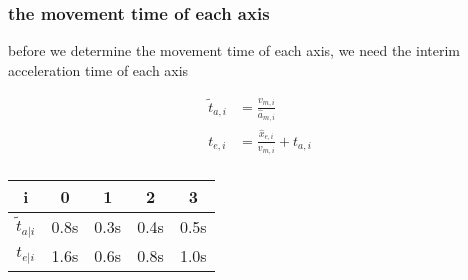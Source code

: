 \documentclass[%
  professionalfonts,%
  xcolor={%
    usenames,%
    dvipsnames,%
    svgnames,%
    table,%
    hyperref%
  }%
]{beamer}
\begin{document}
\subsubsection*{the movement time of each axis}
\begin{frame}
before we determine the movement time of each axis, we need the interim acceleration time of each axis

\begin{align}
\tilde{t}_{a,i} & = \frac{v_{m,i}}{\hat{a}_{m,i}} \\
t_{e,i} & = \frac{\hat{x}_{e,i}}{v_{m,i}} + t_{a,i} \\
\end{align}

\begin{center}
\begin{tabular}{ccccc}
\toprule
i & 0 & 1 & 2 & 3 \\
\midrule
$\tilde{t}_{a|i}$ & 0.8s & 0.3s & 0.4s & 0.5s \\ 
$t_{e|i}$ & 1.6s & 0.6s & 0.8s & 1.0s \\
\bottomrule 
\end{tabular}
\end{center} 
\end{frame}
\end{document}
